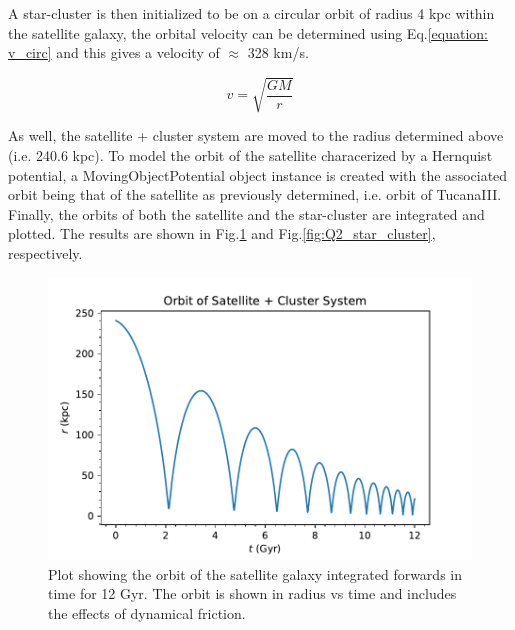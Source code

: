 \documentclass[apj]{emulateapj}
\begin{document}
A star-cluster is then initialized to be on a circular orbit of radius 4 kpc within the satellite galaxy, the orbital velocity can be determined using Eq.\ref{equation: v_circ} and this gives a velocity of $\approx$ 328 km/s.

\begin{equation}
     v = \sqrt{\frac{GM}{r}}
    \label{equation: v_circ}
\end{equation}

As well, the satellite + cluster system are moved to the radius determined above (i.e. 240.6 kpc). To model the orbit of the satellite characerized by a Hernquist potential, a MovingObjectPotential object instance is created with the associated orbit being that of the satellite as previously determined, i.e. orbit of TucanaIII. 
Finally, the orbits of both the satellite and the star-cluster are integrated and plotted. The results are shown in Fig.\ref{fig:Q2_satellite} and Fig.\ref{fig:Q2_star_cluster}, respectively. 

\begin{figure}
    \centering
    \includegraphics[width=1.0\columnwidth]{Q2_sat.pdf}
    \caption{Plot showing the orbit of the satellite galaxy integrated forwards in time for 12 Gyr. The orbit is shown in radius vs time and includes the effects of dynamical friction.}
    \label{fig:Q2_satellite}
\end{figure}
\end{document}
